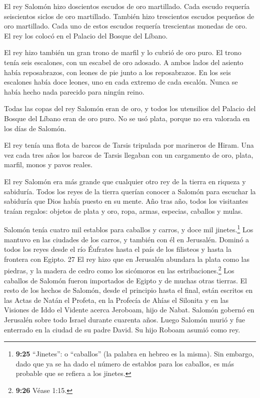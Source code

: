  El rey Salomón hizo doscientos escudos de oro martillado.
Cada escudo requería seiscientos siclos de oro martillado. 
También hizo trescientos escudos pequeños de oro martillado. Cada uno de
estos escudos requería trescientas monedas de oro. El rey los colocó en
el Palacio del Bosque del Líbano.

 El rey hizo también un gran trono de marfil y lo cubrió de
oro puro.  El trono tenía seis escalones, con un escabel de
oro adosado. A ambos lados del asiento había reposabrazos, con leones de
pie junto a los reposabrazos.  En los seis escalones había
doce leones, uno en cada extremo de cada escalón. Nunca se había hecho
nada parecido para ningún reino.

 Todas las copas del rey Salomón eran de oro, y todos los
utensilios del Palacio del Bosque del Líbano eran de oro puro. No se usó
plata, porque no era valorada en los días de Salomón.

 El rey tenía una flota de barcos de Tarsis tripulada por
marineros de Hiram. Una vez cada tres años los barcos de Tarsis llegaban
con un cargamento de oro, plata, marfil, monos y pavos reales.

 El rey Salomón era más grande que cualquier otro rey de la
tierra en riqueza y sabiduría.  Todos los reyes de la
tierra querían conocer a Salomón para escuchar la sabiduría que Dios
había puesto en su mente.  Año tras año, todos los
visitantes traían regalos: objetos de plata y oro, ropa, armas,
especias, caballos y mulas.

 Salomón tenía cuatro mil establos para caballos y carros,
y doce mil jinetes.\footnote{\textbf{9:25} ``Jinetes'': o ``caballos''
  (la palabra en hebreo es la misma). Sin embargo, dado que ya se ha
  dado el número de establos para los caballos, es más probable que se
  refiera a los jinetes.} Los mantuvo en las ciudades de los carros, y
también con él en Jerusalén.  Dominó a todos los reyes
desde el río Éufrates hasta el país de los filisteos y hasta la frontera
con Egipto. 27 El rey hizo que en Jerusalén abundara la plata como las
piedras, y la madera de cedro como los sicómoros en las
estribaciones.\footnote{\textbf{9:26} Véase 1:15.}  Los
caballos de Salomón fueron importados de Egipto y de muchas otras
tierras.  El resto de los hechos de Salomón, desde el
principio hasta el final, están escritos en las Actas de Natán el
Profeta, en la Profecía de Ahías el Silonita y en las Visiones de Iddo
el Vidente acerca Jeroboam, hijo de Nabat.  Salomón gobernó
en Jerusalén sobre todo Israel durante cuarenta años. 
Luego Salomón murió y fue enterrado en la ciudad de su padre David. Su
hijo Roboam asumió como rey.

